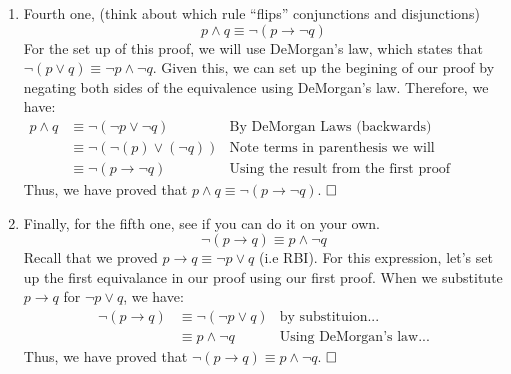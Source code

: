 \documentclass{article}
\newcommand{\sectionbreak}{\clearpage}
\begin{document}
\begin{enumerate}[label=(\alph*)]
    \[p \lor q \equiv \neg p \to q\]
    For this proof, we can again use the same substitution method that we used in the previous proof. Recall that $a \to b \equiv \neg a \lor b$ (expressing RBI in terms of $a$ and $b$). First, to set up the substitution, we must express $p \lor q$ in terms of $\neg a \lor b$. Using the double negation laws, we can express $p \lor q$ as follows:
    \begin{align*}
        p \lor q &\equiv \neg (\neg p) \lor q & \text{Using the double negation laws on p...} \\
        &\equiv \neg p \to q & \text{From our first proof (RBI), using substitution..}
    \end{align*}
    Thus, we have proved that $p \lor q \equiv \neg p \to q$.
    $\hfill \square$
    \sectionbreak
    \item Fourth one, (think about which rule “flips” conjunctions and disjunctions)
    \[p \land q \equiv \neg (p \to \neg q) \]
    For the set up of this proof, we will use DeMorgan's law, which states that $\neg (p \lor q) \equiv \neg p \land \neg q$. Given this, we can set up the begining of our proof by negating both sides of the equivalence using DeMorgan's law. Therefore, we have:
    \begin{align*}
        p \land q &\equiv \neg (\neg p \lor \neg q) & \text{By DeMorgan Laws (backwards)}\\
        &\equiv \neg (\neg (p) \lor (\neg q)) & \text{Note terms in parenthesis we will substitute into the result from our first proof (RBI)...} \\
        &\equiv \neg (p \to \neg q) & \text{Using the result from the first proof (RBI)...}
    \end{align*}
    Thus, we have proved that $p \land q \equiv \neg (p \to \neg q)$.
    $\hfill \square$
    \sectionbreak
    \item Finally, for the fifth one, see if you can do it on your own.
    \[\neg (p \to q) \equiv p \land \neg q\]
    Recall that we proved $p \to q \equiv \neg p \lor q$ (i.e RBI). For this expression, let's set up the first equivalance in our proof using our first proof. When we substitute $p \to q$ for $\neg p \lor q$, we have:
    \begin{align*}
        \neg (p \to q) &\equiv \neg (\neg p \lor q) & \text{by substituion...} \\
        &\equiv p \land \neg q & \text{Using DeMorgan's law...}
    \end{align*}
    Thus, we have proved that $\neg (p \to q) \equiv p \land \neg q$.
    $\hfill \square$

\end{enumerate}
\end{document}
